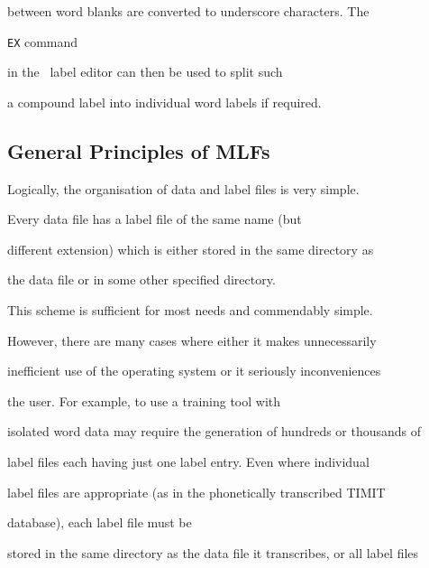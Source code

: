 between word blanks are converted to underscore characters.  The 


\texttt{EX} command


in the \HTK\ label editor  can then be used to split such


a compound label into individual word labels if required.













\subsection{General Principles of MLFs}







Logically, the organisation of data and label files is very simple.


Every data file has a label file of the same name (but


different extension) which is either stored in the same directory as


the data file or in some other specified directory.







This scheme is sufficient for most needs and commendably simple.


However, there are many cases where either it makes unnecessarily


inefficient use of the operating system or it seriously inconveniences


the user.  For example, to use a training tool with


isolated word data may require the generation of hundreds or thousands of


label files each having just one label entry.  Even where individual


label files are appropriate (as in the phonetically transcribed TIMIT


database), each label file must be


stored in the same directory as the data file it transcribes, or all label files


